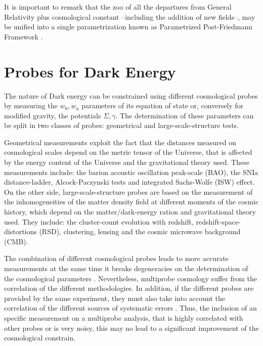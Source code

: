 It is important to remark that the zoo of all the departures from General Relativity plus cosmological constant --including the addition of new fields--, may be unified into a single parametrization known as Parametrized Post-Friedmann Framework \cite{2013PhRvD..87b4015B}.

\section{Probes for Dark Energy}
The nature of Dark energy can be constrained using different cosmological probes \cite{Weinberg201387} by measuring the $w_0,w_a$ parameters of its equation of state or, conversely for modified gravity, the potentials $\Sigma,\gamma$. The determination of these parameters can be split in two classes of probes: geometrical and large-scale-structure tests.
\newline

Geometrical measurements exploit the fact that the distances measured on cosmological scales depend on the metric tensor of the Universe, that is affected by the energy content of the Universe and the gravitational theory used. These measurements include: the barion acoustic oscillation peak-scale (BAO), the SNIa distance-ladder, Alcock-Paczynski \cite{1979Natur.281..358A} tests and integrated Sachs-Wolfe (ISW) effect. On the other side, large-scale-structure probes are based on the measurement of the inhomogeneities of the matter density field at different moments of the cosmic history, which depend on the matter/dark-energy ration and gravitational theory used. They include: the cluster-count evolution with redshift, redshift-space-distortions (RSD), clustering, lensing and the cosmic microwave background (CMB).
\newline

The combination of different cosmological probes leads to more accurate measurements at the same time it breaks degeneracies on the determination of the cosmological parameters \cite{2006A&A...448..831Y,Weinberg201387}. Nevertheless, multiprobe cosmology suffer from the correlation of the different methodologies. In addition, if the different probes are provided by the same experiment, they must also take into account the correlation of the different sources of systematic errors \cite{2016arXiv160105779K,2016arXiv160701761S,2017MNRAS.465L..20S,2017arXiv170307786F}.  Thus, the inclusion of an specific measurement on a multiprobe analysis, that is highly correlated with other probes or is very noisy, this may no lead to a significant improvement of the cosmological constrain.
\newline

